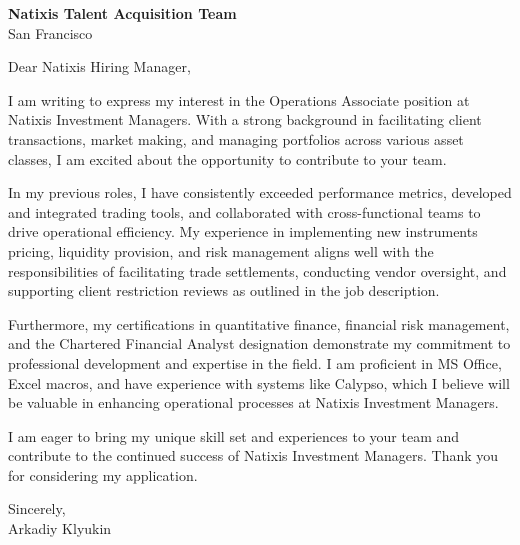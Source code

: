 \documentclass{letter}
\begin{document}
\begin{letter}{\textbf{Natixis Talent Acquisition Team} \\
                San Francisco }


\opening{Dear Natixis Hiring Manager,}

I am writing to express my interest in the Operations Associate position at Natixis Investment Managers. With a strong background in facilitating client transactions, market making, and managing portfolios across various asset classes, I am excited about the opportunity to contribute to your team.

In my previous roles, I have consistently exceeded performance metrics, developed and integrated trading tools, and collaborated with cross-functional teams to drive operational efficiency. My experience in implementing new instruments pricing, liquidity provision, and risk management aligns well with the responsibilities of facilitating trade settlements, conducting vendor oversight, and supporting client restriction reviews as outlined in the job description.

Furthermore, my certifications in quantitative finance, financial risk management, and the Chartered Financial Analyst designation demonstrate my commitment to professional development and expertise in the field. I am proficient in MS Office, Excel macros, and have experience with systems like Calypso, which I believe will be valuable in enhancing operational processes at Natixis Investment Managers.

I am eager to bring my unique skill set and experiences to your team and contribute to the continued success of Natixis Investment Managers. Thank you for considering my application.

Sincerely,\\
Arkadiy Klyukin
\end{letter}
\end{document}
